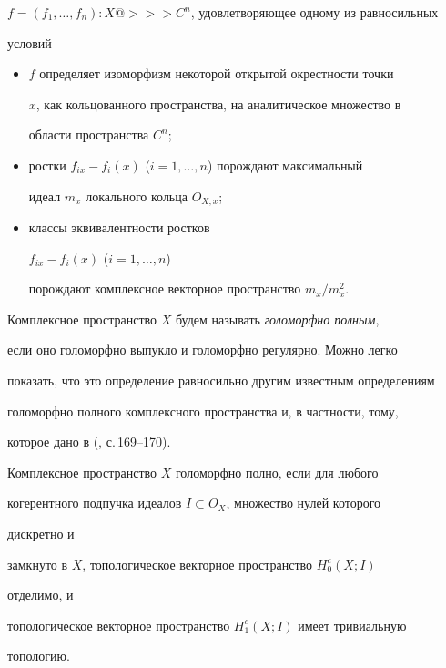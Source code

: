 $f=(f_1,\dotsc,f_n):X@>>>C^n$, удовлетворяющее одному из равносильных 


условий 


\begin{itemize} 


\item[a)] $f$ определяет изоморфизм некоторой открытой окрестности точки 


$x$, как кольцованного пространства, на аналитическое множество в 


области пространства $C^n$; 


\item[б)] ростки $f_{ix}-f_i(x)$ ($i=1,\dotsc,n$) порождают максимальный 


идеал $m_x$ локального кольца $O_{X,x}$; 


\item[в)] классы эквивалентности ростков 


$f_{ix}-f_i(x)$ ($i=1,\dotsc,n$) 


порождают комплексное векторное пространство $m_x/m^2_x$. 


\end{itemize} 


 


Комплексное пространство $X$ будем называть {\it голоморфно полным}, 


если оно голоморфно выпукло и голоморфно регулярно. Можно легко 


показать, что это определение равносильно другим известным определениям 


голоморфно полного комплексного пространства и, в частности, тому, 


которое дано в (\cite{7}, с.\,169--170). 


 


\begin{lem} 


Комплексное пространство $X$ голоморфно полно, если для любого 


когерентного подпучка идеалов $I\subset O_X$, множество нулей которого 


дискретно и 


замкнуто в $X$, топологическое векторное пространство $H^c_0(X;I)$ 


отделимо, и 


топологическое векторное пространство $H^c_1(X;I)$ имеет тривиальную 


топологию. 


\end{lem} 


